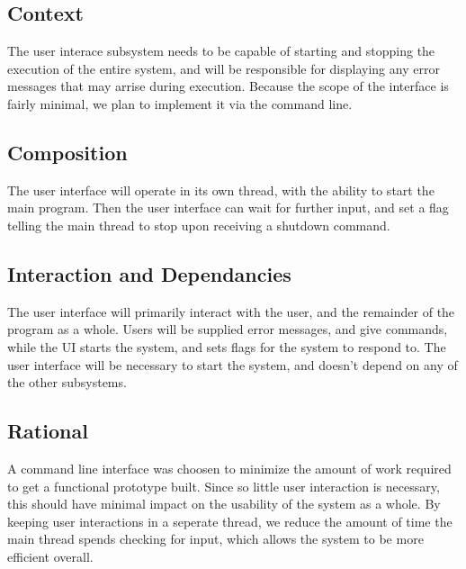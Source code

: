 \subsection{Context}

The user interace subsystem needs to be capable of starting and stopping the execution of the entire system, and will be responsible for displaying any error messages that may arrise during execution.
Because the scope of the interface is fairly minimal, we plan to implement it via the command line.

\subsection{Composition} 

The user interface will operate in its own thread, with the ability to start the main program. 
Then the user interface can wait for further input, and set a flag telling the main thread to stop upon receiving a shutdown command.

\subsection{Interaction and Dependancies}

The user interface will primarily interact with the user, and the remainder of the program as a whole.
Users will be supplied error messages, and give commands, while the UI starts the system, and sets flags for the
system to respond to. The user interface will be necessary to start the system, and doesn't
depend on any of the other subsystems. 

\subsection{Rational}

A command line interface was choosen to minimize the amount of work required to get a functional prototype built.
Since so little user interaction is necessary, this should have minimal impact on the usability of the system as a whole.
By keeping user interactions in a seperate thread, we reduce the amount of time the main thread spends checking for input, 
which allows the system to be more efficient overall. 
 
